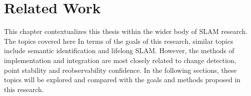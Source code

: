 \section{Related Work}
\label{sec:related_work}

This chapter contextualizes this thesis within the wider body of SLAM research. The topics covered here 
In terms of the goals of this research, similar topics include semantic identification and lifelong SLAM. However, the methods of implementation and integration are most closely related to change detection, point stability and reobservability confidence. In the following sections, these topics will be explored and compared with the goals and methods proposed in this research.

% 